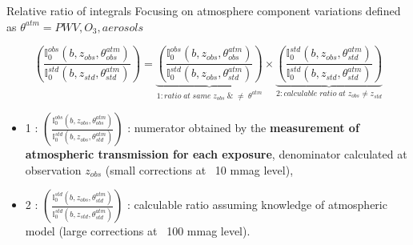 \documentclass{beamer}
\begin{document}
\begin{frame}{Relative ratio of integrals}
Focusing on atmosphere component variations defined as
$\theta^{atm}= PWV, O_3, aerosols$
\begin{alertblock}{}
\begin{equation*}
\left(\frac{\mathbb{I}_0^{obs}(b,z_{obs},\theta_{obs}^{atm})}{\mathbb{I}_0^{std}(b,z_{std},\theta_{std}^{atm})}\right) =
\underbrace{\left(\frac{\mathbb{I}_0^{obs}(b,z_{obs},\theta_{obs}^{atm})}{\mathbb{I}_0^{std}(b,z_{obs},\theta_{std}^{atm})}\right)}_{1:ratio\;at \; same \; z_{obs}\; \& \; \neq \; \theta^{atm}} \times \underbrace{\left(\frac{\mathbb{I}_0^{std}(b,z_{obs},\theta_{std}^{atm})}{\mathbb{I}_0^{std}(b,z_{std},\theta_{std}^{atm})}\right)}_{2:calculable \; ratio \;at \; z_{obs}\neq z_{std} }
\end{equation*}
\end{alertblock}
\begin{itemize}
\item 1 : $\left(\frac{\mathbb{I}_0^{obs}(b,z_{obs},\theta_{obs}^{atm})}{\mathbb{I}_0^{std}(b,z_{obs},\theta_{std}^{atm})}\right)$ : numerator obtained by the {\bf measurement of atmospheric transmission for each exposure}, denominator calculated at observation $z_{obs}$ (small corrections at ~10 mmag level),
\item 2 : $\left(\frac{\mathbb{I}_0^{std}(b,z_{obs},\theta_{std}^{atm})}{\mathbb{I}_0^{std}(b,z_{std},\theta_{std}^{atm})}\right)$ : calculable ratio assuming knowledge of atmospheric model (large corrections at ~100 mmag level). 
\end{itemize}


\end{frame}
\end{document}
